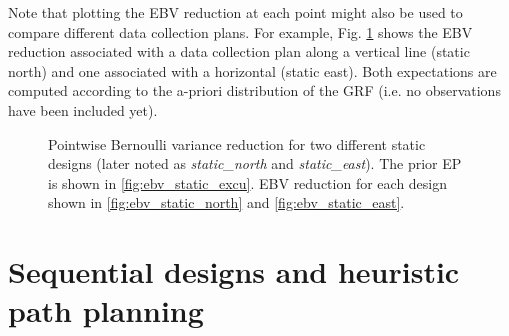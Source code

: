 \documentclass[aoas]{imsart}
\begin{document}
Note that plotting the EBV reduction at each point might also be used
to compare different data collection plans. For example,
Fig. \ref{fig:ebv_north_vs_east} shows the EBV reduction associated
with a data collection plan along a vertical line (static north) and
one associated with a horizontal (static east). Both expectations are
computed according to the a-priori distribution of the GRF (i.e. no
observations have been included yet).


\begin{figure}[ht] 
\centering 
{}
\caption{Pointwise Bernoulli variance reduction for two different static designs (later noted as \textit{static\_north} and \textit{static\_east}). The prior EP is shown in
  \ref{fig:ebv_static_excu}. EBV reduction for each design shown in
  \ref{fig:ebv_static_north} and \ref{fig:ebv_static_east}.}
\label{fig:ebv_north_vs_east}
\end{figure}


\section{Sequential designs and heuristic path planning}
\label{sec:heuristics}
\end{document}
